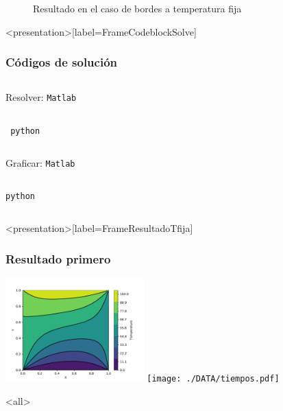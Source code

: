 \begin{figure}
  \caption{Resultado en el caso de bordes a temperatura fija
  \label{FiguraResultadoTfija}}
\end{figure}
%
\mode*
\begin{frame}<presentation>[label=FrameCodeblockSolve]
  \frametitle{Códigos de solución}
  
  \begin{columns}[T]
Resolver: \hfill    \texttt{Matlab}
  \begin{codeblock}
    
  \end{codeblock}
  \end{columns}

  \begin{columns}[T]
\hfill    \texttt{ python }
    \begin{codeblock}
      
    \end{codeblock}
  \end{columns}

  \begin{columns}[T]
  Graficar: \hfill \texttt{Matlab}
    \begin{codeblock}
      
    \end{codeblock}
  \end{columns}

  \begin{columns}[T]
    \hfill \texttt{python}
    \begin{codeblock}
      
    \end{codeblock}
  \end{columns}


\end{frame}
%
%
\begin{frame}<presentation>[label=FrameResultadoTfija]
  \frametitle{Resultado primero}
  \centering
    \includegraphics[width=0.4\textwidth,bb=0cm 0cm 14.5cm 12cm,clip,page=1]
    {./DATA/Temperaturas-Flujos-1.pdf}
    \hspace{1cm}
    \texttt{[image: ./DATA/tiempos.pdf]}

\end{frame}
\mode<all>
